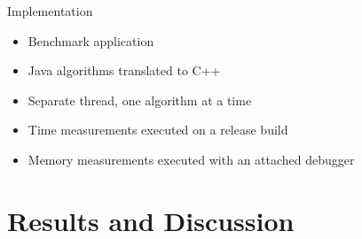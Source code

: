 \documentclass[xcolor={table}]{beamer}
\begin{document}
\begin{frame}{Implementation}
    \begin{itemize}
        \item Benchmark application
        \item Java algorithms translated to C++
        \item Separate thread, one algorithm at a time
        \item Time measurements executed on a release build
        \item Memory measurements executed with an attached debugger
    \end{itemize}
\end{frame}

\section{Results and Discussion}
\end{document}
